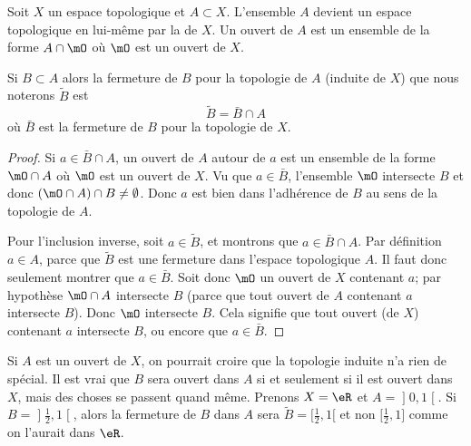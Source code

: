 \begin{definition}  \label{DefVLrgWDB}
Soit \( X\) un espace topologique et \( A\subset X\). L'ensemble \( A\) devient un espace topologique en lui-même par la  de \( X\). Un ouvert de \( A\) est un ensemble de la forme \( A\cap\mO\) où \( \mO\) est un ouvert de \( X\).
\end{definition}

\begin{lemma}       \label{LemkUYkQt}
    Si \( B\subset A\) alors la fermeture de \( B\) pour la topologie de \( A\) (induite de \( X\)) que nous noterons \( \tilde B\) est 
    \begin{equation}
        \tilde B=\bar B\cap A
    \end{equation}
    où \( \bar B\) est la fermeture de \( B\) pour la topologie de \( X\).
\end{lemma}

\begin{proof}
    Si \( a\in \bar B\cap A\), un ouvert de \( A\) autour de \( a\) est un ensemble de la forme \( \mO\cap A\) où \( \mO\) est un ouvert de \( X\). Vu que \( a\in\bar B\), l'ensemble \( \mO\) intersecte \( B\) et donc \( (\mO\cap A)\cap B\neq \emptyset\). Donc \( a\) est bien dans l'adhérence de \( B\) au sens de la topologie de \( A\).

    Pour l'inclusion inverse, soit \( a\in \tilde  B\), et montrons que \( a\in \bar B\cap A\). Par définition \( a\in A\), parce que \( \tilde B\) est une fermeture dans l'espace topologique \( A\). Il faut donc seulement montrer que \( a\in\bar B\). Soit donc \( \mO\) un ouvert de \( X\) contenant \( a\); par hypothèse \( \mO\cap A\) intersecte \( B\) (parce que tout ouvert de \( A\) contenant \( a\) intersecte \( B\)). Donc \( \mO\) intersecte \( B\). Cela signifie que tout ouvert (de \( X\)) contenant \( a\) intersecte \( B\), ou encore que \( a\in \bar B\).
\end{proof}

\begin{example} \label{ExloeyoR}
    Si \( A\) est un ouvert de \( X\), on pourrait croire que la topologie induite n'a rien de spécial. Il est vrai que \( B\) sera ouvert dans \( A\) si et seulement si il est ouvert dans \( X\), mais des choses se passent quand même. Prenons \( X=\eR\) et \( A=\mathopen] 0 , 1 \mathclose[\). Si \( B=\mathopen] \frac{ 1 }{2} , 1 \mathclose[ \), alors la fermeture de \( B\) dans \( A\) sera \( \tilde B=\mathopen[ \frac{ 1 }{2} , 1 [\) et non \( \mathopen[ \frac{ 1 }{2} , 1 \mathclose]\) comme on l'aurait dans \( \eR\).
\end{example}

